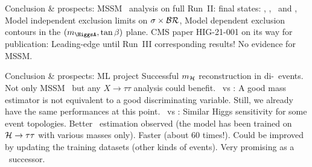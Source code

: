 \begin{frame}{Conclusion \& prospects: \HAtoTauTau}
\manip MSSM \HAtoTauTau\ analysis on full Run~II:
 final states: \tauh\tauh, \mu\tauh, \ele\tauh\ and \ele\mu,
\submanip Model independent exclusion limits on $\sigma\times\mathcal{BR}$,
\submanip Model dependent exclusion contours in the $(m_{\HiggsA}, \tan\beta)$ plane.
\manip CMS paper HIG-21-001 on its way for publication:
\submanip Leading-edge until Run~III corresponding results!
\manip No evidence for MSSM.
\end{frame}

\begin{frame}{Conclusion \& prospects: ML project}
\manip Successful $m_{\mathcal{H}}$ reconstruction in di-\tau\ events.
\submanip Not only MSSM \HAtoTauTau\ but any $X\to\tau\tau$ analysis could benefit.
\manip \mml\ vs \mTtot:
\submanip A good mass estimator is not equivalent to a good discriminating variable.
\submanip Still, we already have the same performances at this point.
\manip \mml\ vs \msv:
\submanip Similar Higgs sensitivity for some event topologies.
\submanip Better \Zboson\ estimation observed (the model has been trained on $\mathcal{H}\to\tau\tau$ with various masses only).
\submanip Faster (about 60 times!).
\submanip Could be improved by updating the training datasets (other kinds of events).
\submanip Very promising as a \SVFIT\ successor.
\end{frame}

